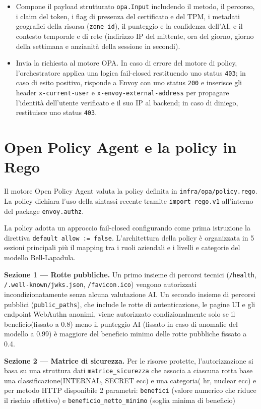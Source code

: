 \begin{itemize}
    \item Compone il payload strutturato \texttt{opa.Input} includendo il metodo, il percorso, i claim del token, i flag di presenza del certificato e del TPM, i metadati geografici della risorsa (\texttt{zone\_id}), il punteggio e la confidenza dell'AI, e il contesto temporale e di rete (indirizzo IP del mittente, ora del giorno, giorno della settimana e anzianità della sessione in secondi).

    \item Invia la richiesta al motore OPA. In caso di errore del motore di policy, l'orchestratore applica una logica fail-closed restituendo uno status \texttt{403}; in caso di esito positivo, risponde a Envoy con uno status \texttt{200} e inserisce gli header \texttt{x-current-user} e \texttt{x-envoy-external-address} per propagare l'identità dell'utente verificato e il suo IP al backend; in caso di diniego, restituisce uno status \texttt{403}.
\end{itemize}

\section{Open Policy Agent e la policy in Rego}

Il motore Open Policy Agent valuta la policy definita in \texttt{infra/opa/policy.rego}. La policy dichiara l'uso della sintassi recente tramite \texttt{import rego.v1} all'interno del package \texttt{envoy.authz}.

La policy adotta un approccio fail-closed configurando come prima istruzione la direttiva \texttt{default allow := false}. L'architettura della policy è organizzata in 5 sezioni principali più il mapping tra i ruoli aziendali e i livelli e categorie del modello Bell-Lapadula.

\textbf{Sezione 1 — Rotte pubbliche.} Un primo insieme di percorsi tecnici (\texttt{/health}, \texttt{/.well-known/jwks.json}, \texttt{/favicon.ico}) vengono autorizzati incondizionatamente senza alcuna valutazione AI. Un secondo insieme di percorsi pubblici (\texttt{public\_paths}), che include le rotte di autenticazione, le pagine UI e gli endpoint WebAuthn anonimi, viene autorizzato condizionalmente solo se il beneficio(fissato a 0.8) meno il punteggio AI (fissato in caso di anomalie del modello a 0.99) è maggiore del beneficio minimo delle rotte pubbliche fissato a 0.4.

\textbf{Sezione 2 — Matrice di sicurezza.} Per le risorse protette, l'autorizzazione si basa su una struttura dati \texttt{matrice\_sicurezza} che associa a ciascuna rotta base  una classificazione(INTERNAL, SECRET ecc) e una categoria( hr, nuclear ecc) e per metodo HTTP disponibile 2 parametri: \texttt{benefici} (valore numerico che riduce il rischio effettivo) e \texttt{beneficio\_netto\_minimo} (soglia minima di beneficio)

